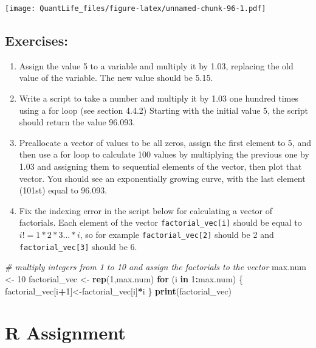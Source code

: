 \documentclass[
]{book}
\newenvironment{Shaded}{\begin{snugshade}}{\end{snugshade}}
\newcommand{\CommentTok}[1]{\textcolor[rgb]{0.56,0.35,0.01}{\textit{#1}}}
\newcommand{\ControlFlowTok}[1]{\textcolor[rgb]{0.13,0.29,0.53}{\textbf{#1}}}
\newcommand{\DecValTok}[1]{\textcolor[rgb]{0.00,0.00,0.81}{#1}}
\newcommand{\KeywordTok}[1]{\textcolor[rgb]{0.13,0.29,0.53}{\textbf{#1}}}
\newcommand{\NormalTok}[1]{#1}
\newcommand{\OperatorTok}[1]{\textcolor[rgb]{0.81,0.36,0.00}{\textbf{#1}}}
\newcommand{\StringTok}[1]{\textcolor[rgb]{0.31,0.60,0.02}{#1}}
\theoremstyle{definition}
\theoremstyle{definition}
\theoremstyle{definition}
\theoremstyle{remark}
\begin{document}
\texttt{[image: QuantLife\_files/figure-latex/unnamed-chunk-96-1.pdf]}

\hypertarget{exercises-13}{%
\subsection{Exercises:}\label{exercises-13}}

\begin{enumerate}
\def\labelenumi{\arabic{enumi}.}
\item
  Assign the value 5 to a variable and multiply it by 1.03, replacing the old value of the variable. The new value should be 5.15.
\item
  Write a script to take a number and multiply it by 1.03 one hundred times using a for loop (see section 4.4.2) Starting with the initial value 5, the script should return the value 96.093.
\item
  Preallocate a vector of values to be all zeros, assign the first element to 5, and then use a for loop to calculate 100 values by multiplying the previous one by 1.03 and assigning them to sequential elements of the vector, then plot that vector. You should see an exponentially growing curve, with the last element (101st) equal to 96.093.
\item
  Fix the indexing error in the script below for calculating a vector of factorials. Each element of the vector \texttt{factorial\_vec{[}i{]}} should be equal to \(i!= 1*2*3...*i\), so for example \texttt{factorial\_vec{[}2{]}} should be 2 and \texttt{factorial\_vec{[}3{]}} should be 6.
\end{enumerate}

\begin{Shaded}
\begin{Highlighting}[]
\CommentTok{\# multiply integers from 1 to 10 and assign the factorials to the vector }
\NormalTok{max.num \textless{}{-}}\StringTok{ }\DecValTok{10}
\NormalTok{factorial\_vec \textless{}{-}}\StringTok{ }\KeywordTok{rep}\NormalTok{(}\DecValTok{1}\NormalTok{,max.num)}
\ControlFlowTok{for}\NormalTok{ (i }\ControlFlowTok{in} \DecValTok{1}\OperatorTok{:}\NormalTok{max.num) \{}
\NormalTok{  factorial\_vec[i}\OperatorTok{+}\DecValTok{1}\NormalTok{]\textless{}{-}factorial\_vec[i]}\OperatorTok{*}\NormalTok{i}
\NormalTok{\}}
\KeywordTok{print}\NormalTok{(factorial\_vec)}
\end{Highlighting}
\end{Shaded}

\hypertarget{r-assignment-4}{%
\section{R Assignment}\label{r-assignment-4}}
\end{document}
